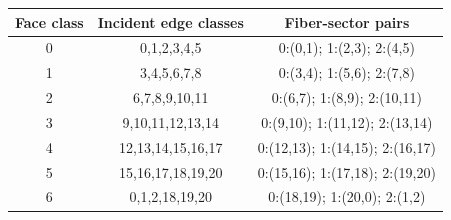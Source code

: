 \begin{center}\small
\begin{tabular}{c|c|c}
\toprule
Face class & Incident edge classes & Fiber-sector pairs\\
\midrule
0 & 0,1,2,3,4,5 & 0:(0,1); 1:(2,3); 2:(4,5)\\
1 & 3,4,5,6,7,8 & 0:(3,4); 1:(5,6); 2:(7,8)\\
2 & 6,7,8,9,10,11 & 0:(6,7); 1:(8,9); 2:(10,11)\\
3 & 9,10,11,12,13,14 & 0:(9,10); 1:(11,12); 2:(13,14)\\
4 & 12,13,14,15,16,17 & 0:(12,13); 1:(14,15); 2:(16,17)\\
5 & 15,16,17,18,19,20 & 0:(15,16); 1:(17,18); 2:(19,20)\\
6 & 0,1,2,18,19,20 & 0:(18,19); 1:(20,0); 2:(1,2)\\
\bottomrule
\end{tabular}
\end{center}
